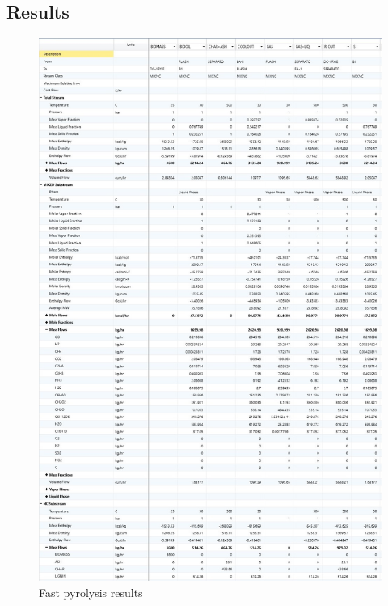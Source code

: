 \newpage \subsection{Results}
\begin{figure}[h!]
	\centering
	\includegraphics[width=0.91\linewidth]{Figures/TchermochemicalProcesses/PyrolysisResults.jpg}
	\caption{Fast pyrolysis results}
\end{figure}